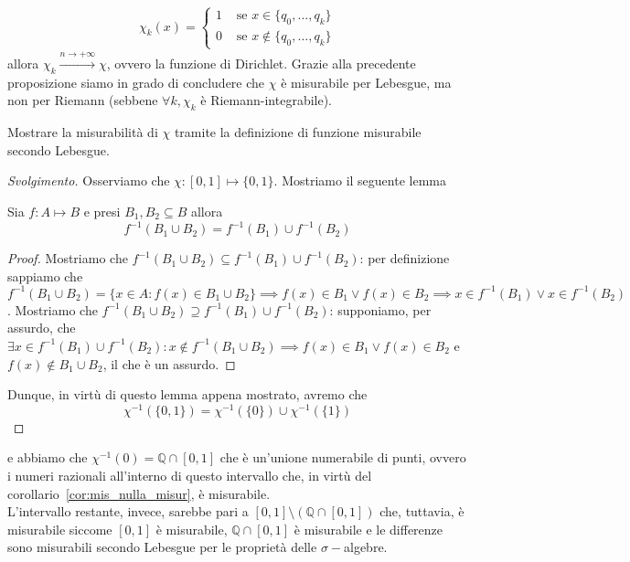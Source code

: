 \begin{align*}
	\chi_k(x) = \begin{cases}
		1 & \text{ se } x \in \{q_0, \ldots, q_k \} \\
		0 & \text{ se } x \not\in \{q_0, \ldots, q_k \}
	\end{cases}
\end{align*}
allora $\chi_k \stackrel{n \to +\infty}{\to} \chi$, ovvero la funzione di Dirichlet. Grazie alla precedente proposizione siamo in grado di concludere che $\chi$ è misurabile per Lebesgue, ma non per Riemann (sebbene $\forall k, \chi_k$ è Riemann-integrabile).
\begin{exercise}
Mostrare la misurabilità di $\chi$ tramite la definizione di funzione misurabile secondo Lebesgue.
\end{exercise}
\begin{proof}[Svolgimento]
	Osserviamo che $\chi: [0, 1] \mapsto \{0, 1\}$. Mostriamo il seguente lemma
	\begin{lemma}
		Sia $f: A \mapsto B$ e presi $B_1, B_2 \subseteq B$ allora
		$$
			f^{-1}(B_1 \cup B_2) = f^{-1}(B_1) \cup f^{-1}(B_2)
		$$
	\end{lemma}
	\begin{proof}
		Mostriamo che $f^{-1}(B_1 \cup B_2) \subseteq f^{-1}(B_1) \cup f^{-1}(B_2)$: per definizione sappiamo che $f^{-1}(B_1 \cup B_2) = \{x \in A: f(x) \in B_1 \cup B_2 \} \implies f(x) \in B_1 \vee f(x) \in B_2 \implies x \in f^{-1}(B_1) \vee x \in f^{-1}(B_2)$.
		Mostriamo che $f^{-1}(B_1 \cup B_2) \supseteq f^{-1}(B_1) \cup f^{-1}(B_2)$: supponiamo, per assurdo, che $\exists x \in f^{-1}(B_1) \cup f^{-1}(B_2) : x \not\in f^{-1}(B_1 \cup B_2) \implies f(x) \in B_1 \vee f(x) \in B_2$ e $f(x) \not\in B_1 \cup B_2$, il che è un assurdo.
	\end{proof}
	Dunque, in virtù di questo lemma appena mostrato, avremo che
	$$
		\chi^{-1}(\{0, 1\}) = \chi^{-1}(\{0 \}) \cup \chi^{-1}(\{1 \})
	$$
\end{proof}
e abbiamo che $\chi^{-1}({0}) = \mathbb{Q} \cap [0, 1]$ che è un'unione numerabile di punti, ovvero i numeri razionali all'interno di questo intervallo che, in virtù del corollario~\ref{cor:mis_nulla_misur}, è misurabile. \\
L'intervallo restante, invece, sarebbe pari a $[0, 1] \setminus (\mathbb{Q} \cap [0,1])$ che, tuttavia, è misurabile siccome $[0,1]$ è misurabile, $\mathbb{Q} \cap [0,1]$ è misurabile e le differenze sono misurabili secondo Lebesgue per le proprietà delle $\sigma-$algebre.
